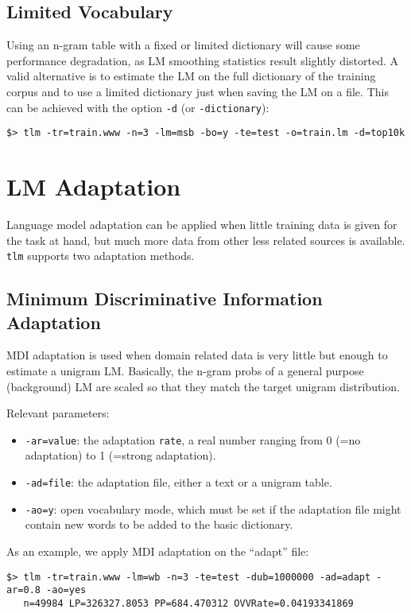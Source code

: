 \documentclass[11pt]{article}
\begin{document}
\subsection*{Limited Vocabulary}
\noindent
Using an  n-gram table  with a fixed  or limited  dictionary  will cause
some performance  degradation, as LM smoothing  statistics result
slightly distorted. A  valid alternative is to estimate  the LM on the
full dictionary of the training corpus and to use a limited dictionary
just when  saving the  LM on a  file.  This  can be achieved  with the
option {\tt -d} (or {\tt -dictionary}):
\begin{verbatim}
$> tlm -tr=train.www -n=3 -lm=msb -bo=y -te=test -o=train.lm -d=top10k
\end{verbatim}

\newpage
\section{LM Adaptation}
Language model adaptation can be  applied when little training data is given for the 
task at hand, but much more data from other less related sources is available.  {\tt tlm} supports two adaptation methods.

\subsection{Minimum Discriminative Information Adaptation}
MDI adaptation  is used  when domain related  data is very  little but
enough to  estimate a  unigram LM.  Basically,  the n-gram probs  of a
general  purpose (background)  LM are  scaled so  that they  match the
target unigram distribution.
	
\noindent	 
Relevant parameters:
\begin{itemize}
\item {\tt -ar=value}: the adaptation {\tt rate},  a real number ranging 
 from 0 (=no adaptation) to 1 (=strong adaptation).

\item {\tt -ad=file}: the  adaptation file,  either a text  or a
  unigram table.

\item {\tt -ao=y}: open vocabulary mode, which  must be set if the adaptation file
 might contain new words to be added to the basic dictionary.
\end{itemize}

\noindent
As an example, we apply MDI adaptation on the ``adapt'' file:
\begin{small}
\begin{verbatim}
$> tlm -tr=train.www -lm=wb -n=3 -te=test -dub=1000000 -ad=adapt -ar=0.8 -ao=yes
   n=49984 LP=326327.8053 PP=684.470312 OVVRate=0.04193341869
\end{verbatim}
\end{small}
\end{document}
